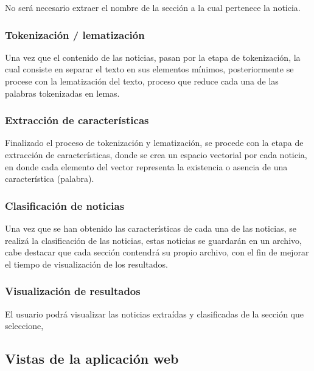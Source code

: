 No será necesario extraer el nombre de la sección a la cual pertenece la noticia.\\

\subsubsection{Tokenización / lematización}
Una vez que el contenido de las noticias, pasan por la etapa de tokenización, la cual consiste en separar el texto en sus elementos mínimos, posteriormente se procese con la lematización del texto, proceso que reduce cada una de las palabras tokenizadas en lemas.


\subsubsection{Extracción de características}
Finalizado el proceso de tokenización y lematización, se procede con la etapa de extracción de características, donde se crea un espacio vectorial por cada noticia, en donde cada elemento del vector representa la existencia o asencia de una característica (palabra).

\subsubsection{Clasificación de noticias}
Una vez que se han obtenido las características de cada una de las noticias, se realizá la clasificación de las noticias, estas noticias se guardarán en un archivo, cabe destacar que cada sección contendrá su propio archivo, con el fin de mejorar el tiempo de visualización de los resultados.

\subsubsection{Visualización de resultados}
El usuario podrá visualizar las noticias extraídas y clasificadas de la sección que seleccione, 

\subsection{Vistas de la aplicación web}

